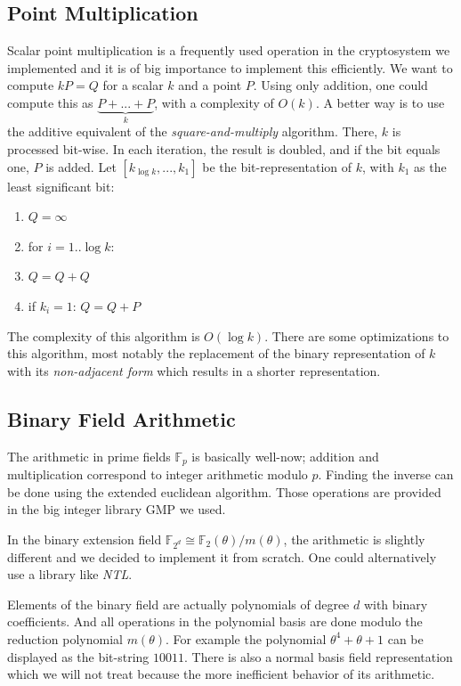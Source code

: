 \documentclass[11pt,english]{article}
\begin{document}
\subsection{Point Multiplication}
Scalar point multiplication is a frequently used operation in the cryptosystem we implemented and it is of big importance to implement this efficiently. We want to compute $kP=Q$ for a scalar $k$ and a point $P$. Using only addition, one could compute this as $\underbrace{P+...+P}_{k}$, with a complexity of $O(k)$. A better way is to use the additive equivalent of the \emph{square-and-multiply} algorithm. There, $k$ is processed bit-wise. In each iteration, the result is doubled, and if the bit equals one, $P$ is added. Let $[k_{\log{k}},...,k_1]$ be the bit-representation of $k$, with $k_1$ as the least significant bit:

\begin{enumerate}
 \item $Q=\infty$
 \item for $i=1..\log{k}$:
 \item $Q=Q+Q$
 \item if $k_i=1$: $Q=Q+P$
\end{enumerate}

The complexity of this algorithm is $O(\log{k})$. There are some optimizations to this algorithm, most notably the replacement of the binary representation of $k$ with its \emph{non-adjacent form} which results in a shorter representation. 

\subsection{Binary Field Arithmetic}
The arithmetic in prime fields $\mathbb{F}_p$ is basically well-now; addition and multiplication correspond to integer arithmetic modulo $p$. Finding the inverse can be done using the extended euclidean algorithm. Those operations are provided in the big integer library GMP we used.

In the binary extension field $\mathbb{F}_{2^d}\cong \mathbb{F}_2(\theta)/m(\theta)$, the arithmetic is slightly different and we decided to implement it from scratch. One could alternatively use a library like \emph{NTL}.

Elements of the binary field are actually polynomials of degree $d$ with binary coefficients. And all operations in the polynomial basis are done modulo the reduction polynomial $m(\theta)$. For example the polynomial $\theta^4+\theta+1$ can be displayed as the bit-string $10011$. There is also a normal basis field representation which we will not treat because the more inefficient behavior of its arithmetic.
\end{document}
